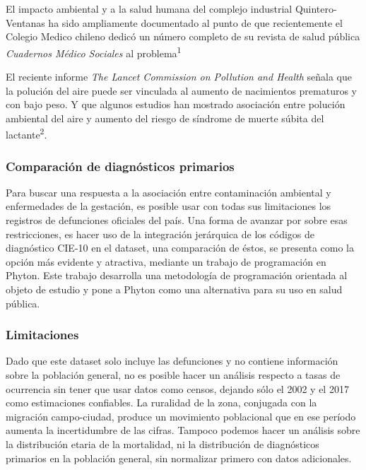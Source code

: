 \documentclass[]{article}
\begin{document}
El impacto ambiental y a la salud humana del complejo industrial
Quintero-Ventanas ha sido ampliamente documentado al punto de que recientemente el Colegio Medico chileno dedicó un número completo de su revista de salud
pública \emph{Cuadernos Médico Sociales} al problema\textsuperscript{{1}}

El reciente informe \emph{The Lancet Commission on Pollution and Health}
señala que la polución del aire puede ser vinculada al aumento de
nacimientos prematuros y con bajo peso. Y que algunos estudios han
mostrado asociación entre polución ambiental del aire y aumento del
riesgo de síndrome de muerte súbita del lactante\textsuperscript{{2}}.

\hypertarget{comparaciuxf3n-de-diagnuxf3sticos-primarios}{%
\subsubsection{Comparación de diagnósticos
primarios}\label{comparaciuxf3n-de-diagnuxf3sticos-primarios}}

Para buscar una respuesta a la asociación entre contaminación ambiental y enfermedades de la gestación, es posible usar con todas sus limitaciones los registros de defunciones oficiales del país. Una forma de avanzar por sobre esas restricciones, es hacer uso de la integración jerárquica de los códigos de diagnóstico CIE-10 en el dataset, una comparación de éstos, se presenta como la
opción más evidente y atractiva, mediante un trabajo de programación en Phyton. Este trabajo desarrolla una metodología de programación orientada al objeto de estudio y pone a Phyton como una alternativa para su uso en salud pública.

\hypertarget{limitaciones}{%
\subsubsection{Limitaciones}\label{limitaciones}}

Dado que este dataset solo incluye las defunciones y no contiene
información sobre la población general, no es posible hacer un análisis
respecto a tasas de ocurrencia sin tener que usar datos
como censos, dejando sólo el 2002 y el 2017 como estimaciones confiables. La ruralidad de la zona, conjugada con la migración
campo-ciudad, produce un movimiento poblacional que en ese período aumenta la incertidumbre de las cifras. Tampoco podemos hacer un
análisis sobre la distribución etaria de la mortalidad, ni la
distribución de diagnósticos primarios en la población general, sin
normalizar primero con datos adicionales.
\end{document}

